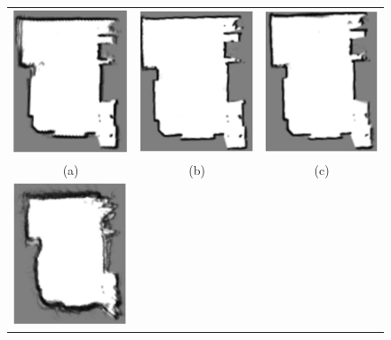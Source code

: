 \documentclass{article}
\begin{document}
\begin{figure}[H]
    \centering
    \begin{tabular}{ccc}
         \includegraphics{image/a.PNG}   
         &\includegraphics{image/b.PNG} 
         &\includegraphics{image/c.PNG} 
         \\ (a) & (b) & (c) \\
         \includegraphics{image/d.PNG} 

\end{tabular}
\end{figure}
\end{document}

